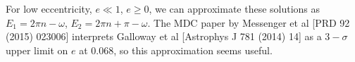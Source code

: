 \documentclass{article}
\begin{document}
\noindent For low eccentricity, $e \ll 1$, $e\geq 0$, we can approximate these solutions as $E_1 = 2\pi n - \omega$, $E_2 = 2\pi n + \pi - \omega$.
The MDC paper by Messenger et al [PRD 92 (2015) 023006] interprets Galloway et al [Astrophys J 781 (2014) 14] as a $3-\sigma$ upper limit on $e$ at 0.068, so this approximation seems useful.
\end{document}

